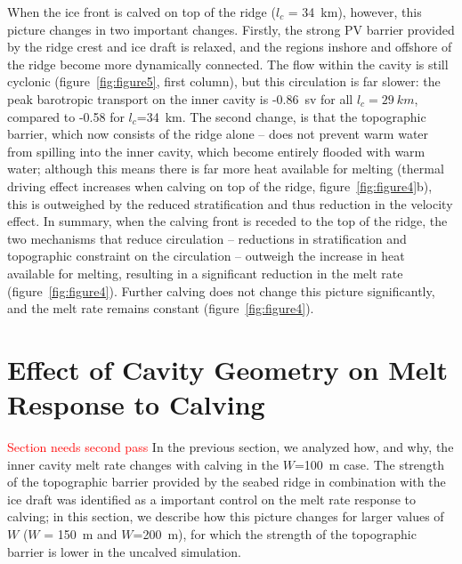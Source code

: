 \documentclass[draft]{agujournal2019}
\newcommand{\red}[1]{\textcolor{red}{#1}}
\begin{document}
When the ice front is calved on top of the ridge ($l_c$ = 34~km), however, this picture changes in two important changes. Firstly, the strong PV barrier provided by the ridge crest and ice draft is relaxed, and the regions inshore and offshore of the ridge become more dynamically connected. The flow within the cavity is still cyclonic (figure~\ref{fig:figure5}, first column), but this circulation is far slower: the peak barotropic transport on the inner cavity is -0.86~sv for all $l_c = 29~km$, compared to -0.58 for $l_c$=34~km. The second change, is that the topographic barrier, which now consists of the ridge alone -- does not prevent warm water from spilling into the inner cavity, which become entirely flooded with warm water; although this means there is far more heat available for melting (thermal driving effect increases when calving on top of the ridge, figure~\ref{fig:figure4}b), this is outweighed by the reduced stratification and thus reduction in the velocity effect. In summary, when the calving front is receded to the top of the ridge, the two mechanisms that reduce circulation -- reductions in stratification and topographic constraint on the circulation -- outweigh the increase in heat available for melting, resulting in a significant reduction in the melt rate (figure~\ref{fig:figure4}). Further calving does not change this picture significantly, and the melt rate remains constant (figure~\ref{fig:figure4}).


\section{Effect of Cavity Geometry on Melt Response to Calving}\label{S:Results:H}
\red{Section needs second pass}
In the previous section, we analyzed how, and why, the inner cavity melt rate changes with calving in the $W$=100~m case. The strength of the topographic barrier provided by the seabed ridge in combination with the ice draft was identified as a important control on the melt rate response to calving; in this section, we describe how this picture changes for larger values of $W$ ($W$ = 150~m and $W$=200~m), for which the strength of the topographic barrier is lower in the uncalved simulation.

\end{document}
